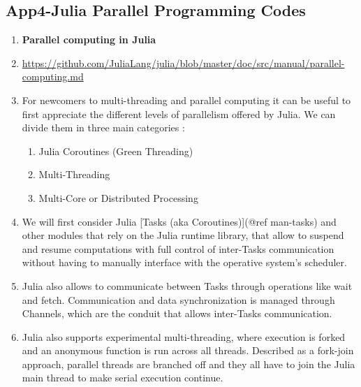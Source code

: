 \pagebreak
\clearpage

\subsection{App4-Julia Parallel Programming Codes}

\begin{enumerate}

	\item \textbf{Parallel computing in Julia}
	
	\item \url{https://github.com/JuliaLang/julia/blob/master/doc/src/manual/parallel-computing.md}
	
	\item For newcomers to multi-threading and parallel computing it can be useful to first appreciate the different levels of parallelism offered by Julia. We can divide them in three main categories :
	
	\begin{enumerate}
		\item Julia Coroutines (Green Threading)
		\item Multi-Threading
		\item Multi-Core or Distributed Processing
	\end{enumerate}
	
	\item We will first consider Julia [Tasks (aka Coroutines)](@ref man-tasks) and other modules that rely on the Julia runtime library, that allow to suspend and resume computations with full control of inter-Tasks communication without having to manually interface with the operative system's scheduler. 
	
	\item Julia also allows to communicate between Tasks through operations like wait and fetch. Communication and data synchronization is managed through Channels, which are the conduit that allows inter-Tasks communication.
	
	\item Julia also supports experimental multi-threading, where execution is forked and an anonymous function is run across all threads. Described as a fork-join approach, parallel threads are branched off and they all have to join the Julia main thread to make serial execution continue. 
	

\end{enumerate}
